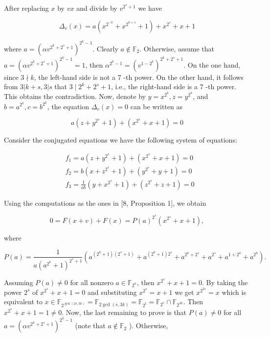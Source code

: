 \documentclass[10pt]{article}
\begin{document}
After replacing $x$ by $v x$ and divide by $v^{2^{s}+1}$ we have

$$
\Delta_{v}(x)=a\left(x^{2^{-k}}+x^{2^{k+s}}+1\right)+x^{2^{s}}+x+1
$$

where $a=\left(\alpha v^{2^{k}+2^{s}+1}\right)^{2^{k}-1}$. Clearly $a \notin \mathbb{F}_{2}$. Otherwise, assume that $a=\left(\alpha v^{2^{k}+2^{s}+1}\right)^{2^{k}-1}=1$, then $\alpha^{2^{k}-1}=\left(v^{1-2^{k}}\right)^{2^{k}+2^{s}+1}$. On the one hand, since $3 \nmid k$, the left-hand side is not a 7 -th power. On the other hand, it follows from $3|k+s, 3| s$ that $3 \mid 2^{k}+2^{s}+1$, i.e., the right-hand side is a 7 -th power. This obtains the contradiction. Now, denote by $y=x^{2^{k}}, z=y^{2^{k}}$, and $b=a^{2^{k}}, c=b^{2^{k}}$, the equation $\Delta_{v}(x)=0$ can be written as

$$
a\left(z+y^{2^{s}}+1\right)+\left(x^{2^{s}}+x+1\right)=0
$$

Consider the conjugated equations we have the following system of equations:

$$
\begin{aligned}
& f_{1}=a\left(z+y^{2^{s}}+1\right)+\left(x^{2^{s}}+x+1\right)=0 \\
& f_{2}=b\left(x+z^{2^{s}}+1\right)+\left(y^{2^{s}}+y+1\right)=0 \\
& f_{3}=\frac{1}{a b}\left(y+x^{2^{s}}+1\right)+\left(z^{2^{s}}+z+1\right)=0
\end{aligned}
$$

Using the computations as the ones in [8, Proposition 1], we obtain

$$
0=F(x+v)+F(x)=P(a)^{2^{s}}\left(x^{2^{s}}+x+1\right),
$$

where

$$
P(a)=\frac{1}{a\left(a^{2^{k}}+1\right)^{2^{s}+1}}\left(a^{\left(2^{k}+1\right)\left(2^{s}+1\right)}+a^{\left(2^{k}+1\right) 2^{s}}+a^{2^{k}+2^{s}}+a^{2^{s}}+a^{1+2^{k}}+a^{2^{k}}\right) .
$$

Assuming $P(a) \neq 0$ for all nonzero $a \in \mathbb{F}_{2^{n}}$, then $x^{2^{s}}+x+1=0$. By taking the power $2^{s}$ of $x^{2^{s}}+x+ 1=0$ and substituting $x^{2^{s}}=x+1$ we get $x^{2^{2 s}}=x$ which is equivalent to $x \in \mathbb{F}_{2^{\operatorname{gcd}(2 s, 3 k)}}=\mathbb{F}_{2 \operatorname{gcd}(s, 3 k)}= \mathbb{F}_{2^{t}}=\mathbb{F}_{2^{s}} \cap \mathbb{F}_{2^{3 k}}$. Then $x^{2^{s}}+x+1=1 \neq 0$. Now, the last remaining to prove is that $P(a) \neq 0$ for all $a=\left(\alpha v^{2^{k}+2^{s}+1}\right)^{2^{k}-1}$ (note that $a \notin \mathbb{F}_{2}$ ). Otherwise,
\end{document}
